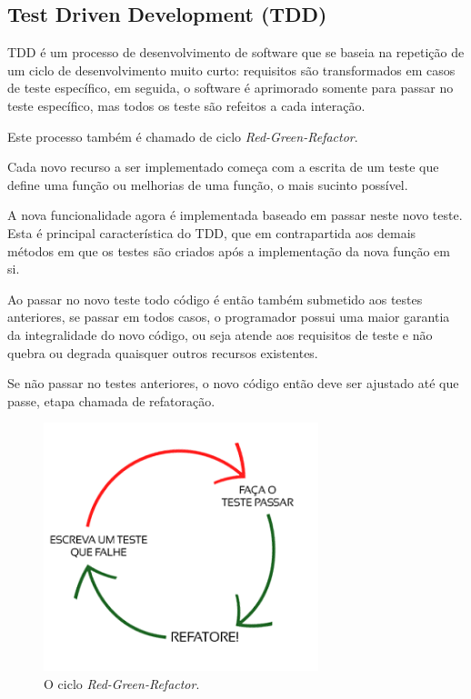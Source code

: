 \subsection{Test Driven Development (TDD)}
\par TDD é um processo de desenvolvimento de software que se baseia na repetição de um ciclo de desenvolvimento muito curto: requisitos são transformados em casos de teste específico, em seguida, o software é aprimorado somente para passar no teste específico, mas todos os teste são refeitos a cada interação.
\par Este processo também é chamado de ciclo \emph{Red-Green-Refactor}.
\par Cada novo recurso a ser implementado começa com a escrita de um teste que define uma função ou melhorias de uma função, o mais sucinto possível.
\par A nova funcionalidade agora é implementada baseado em passar neste novo teste. Esta é principal característica do TDD, que em contrapartida aos demais métodos em que os testes são criados após a implementação da nova função em si.
\par Ao passar no novo teste todo código é então também submetido aos testes anteriores, se passar em todos casos, o programador possui uma maior garantia da integralidade do novo código, ou seja atende aos requisitos de teste e não quebra ou degrada quaisquer outros recursos existentes.
\par Se não passar no testes anteriores, o novo código então deve ser ajustado até que passe, etapa chamada de refatoração.
\begin{figure}[!htb]
\centering
\includegraphics[width=8cm]{figuras/red_green}
\caption{\label{fig:red_green}O ciclo \emph{Red-Green-Refactor}.}
\end{figure}
